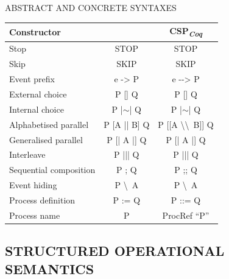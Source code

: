 \documentclass[t]{beamer}
\newcommand{\CSPcoq}{CSP\textsubscript{\textit{Coq}}}
\begin{document}
\begin{frame}{ABSTRACT AND CONCRETE SYNTAXES}
	\begin{table}[htb]
		\scriptsize
		\begin{center}
			\begin{tabular}{ |l|c|c| }
				\hline
				Constructor & \CSPM{} & \CSPcoq{} \\
				\hline
				Stop & STOP & STOP \\ [0.5ex]
				Skip & SKIP & SKIP \\ [0.5ex]
				Event prefix & e -> P & e -{}-> P \\  [0.5ex]
				External choice & P [] Q & P [] Q \\  [0.5ex]
				Internal choice & P |$ \sim $| Q & P |$ \sim $| Q \\ [0.5ex]
				Alphabetised parallel & P [A || B] Q & P [[A \textbackslash\textbackslash \ B]] Q \\ [0.5ex]
				Generalised parallel & P [| A |] Q & P [| A |] Q \\ [0.5ex]
				Interleave & P ||| Q & P ||| Q \\ [0.5ex]
				Sequential composition & P ; Q & P ;; Q \\ [0.5ex]
				Event hiding & P \textbackslash \ A & P \textbackslash \ A \\ [0.5ex]
				Process definition & P := Q & P ::= Q \\ [0.5ex]
				Process name & P & ProcRef ``P'' \\ [0.5ex]
				\hline
			\end{tabular}
		\end{center}
	\end{table}
\end{frame}

\subsection{STRUCTURED OPERATIONAL SEMANTICS}
\end{document}
